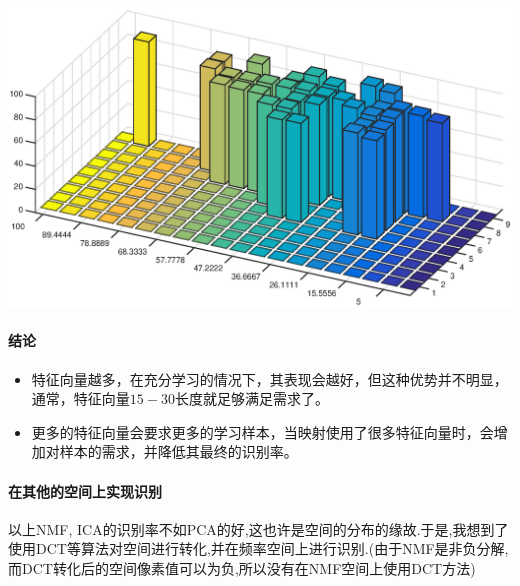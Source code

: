 	\begin{center}
	\begin{minipage}[t]{\linewidth}
	\center
	{
	\includegraphics[width=\MyFactor\textwidth]{Img/c4/pca85} 
		\captionsetup{justification=centering}
	}
	\end{minipage}
	\medskip
	\end{center}
	
	
	\paragraph{结论}
	\begin{itemize}
	\item 特征向量越多，在充分学习的情况下，其表现会越好，但这种优势并不明显，通常，特征向量$15-30$长度就足够满足需求了。
	\item 更多的特征向量会要求更多的学习样本，当映射使用了很多特征向量时，会增加对样本的需求，并降低其最终的识别率。
	\end{itemize}	
	
	\paragraph{在其他的空间上实现识别} 以上NMF, ICA的识别率不如PCA的好,这也许是空间的分布的缘故.于是,我想到了使用DCT等算法对空间进行转化,并在频率空间上进行识别.(由于NMF是非负分解,而DCT转化后的空间像素值可以为负,所以没有在NMF空间上使用DCT方法) \newline
	
